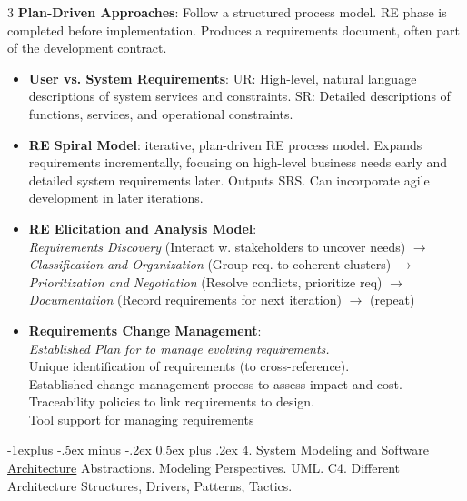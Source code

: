 \documentclass[a4paper, 10pt, landscape]{article}
\makeatletter
\renewcommand{\subsection}{\@startsection{subsection}{2}{0mm}%
                                {-1explus -.5ex minus -.2ex}%
                                {0.5ex plus .2ex}%
                                {\normalfont\normalsize\bfseries}}
\makeatother
\begin{document}
\begin{multicols*}{3}
\textbf{Plan-Driven Approaches}: Follow a structured process model. RE phase is completed before implementation. Produces a requirements document, often part of the development contract.
\begin{itemize}
    \item \textbf{User vs. System Requirements}: UR: High-level, natural language descriptions of system services and constraints. SR: Detailed descriptions of functions, services, and operational constraints.
    \item \textbf{RE Spiral Model}: iterative, plan-driven RE process model. Expands requirements incrementally, focusing on high-level business needs early and detailed system requirements later. Outputs SRS. Can incorporate agile development in later iterations.
    \item \textbf{RE Elicitation and Analysis Model}: \\
     \textit{Requirements Discovery} (Interact w. stakeholders to uncover needs) $\rightarrow$ 
    \textit{Classification and Organization} (Group req. to coherent clusters) $\rightarrow$
    \textit{Prioritization and Negotiation} (Resolve conflicts, prioritize req) $\rightarrow$
    \textit{Documentation} (Record requirements for next iteration) $\rightarrow$ (repeat)
    \item \textbf{Requirements Change Management}: \\
    \textit{Established Plan for to manage evolving requirements.} \\
    Unique identification of requirements (to cross-reference). \\
    Established change management process to assess impact and cost. \\
    Traceability policies to link requirements to design. \\
    Tool support for managing requirements
\end{itemize}

\columnbreak

\subsection{4. \underline{System Modeling and Software Architecture}}
Abstractions. Modeling Perspectives. UML. C4. Different Architecture Structures, Drivers, Patterns, Tactics.


\end{multicols*}
\end{document}

